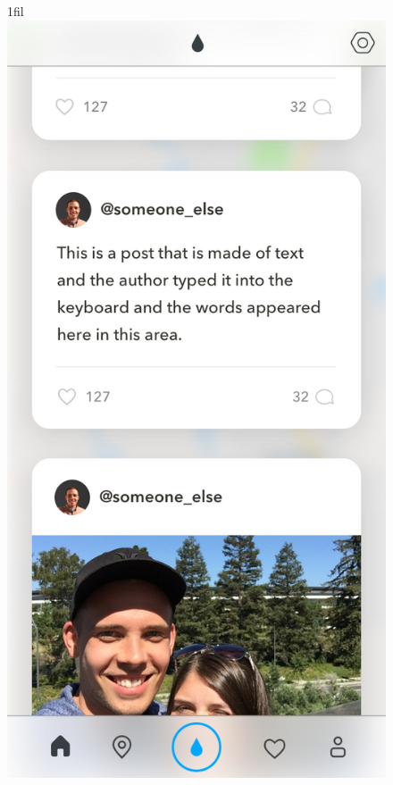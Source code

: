 \documentclass[draftclsnofoot, onecolumn, letterpaper,10pt,compsoc]{IEEEtran}
\makeatletter
\newcommand*{\centerfloat}{%
  \parindent \z@
  \leftskip \z@ \@plus 1fil \@minus \textwidth
  \rightskip\leftskip
  \parfillskip \z@skip}
\newcommand*{\centerfloat}{%
  \parindent \z@
  \leftskip \z@ \@plus 1fil \@minus \textwidth
  \rightskip\leftskip
  \parfillskip \z@skip}
\makeatother
\begin{document}
\begin{figure}[H]
    \captionsetup{justification=centering}
    \centerfloat
    \includegraphics[scale=.25]{home.jpg}

\end{figure}
\end{document}
